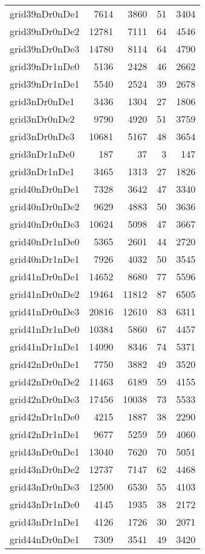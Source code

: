 \begin{longtable}{lrrrr}
grid39nDr0nDe1 & 7614 & 3860 & 51 & 3404 \\
grid39nDr0nDe2 & 12781 & 7111 & 64 & 4546 \\
grid39nDr0nDe3 & 14780 & 8114 & 64 & 4790 \\
grid39nDr1nDe0 & 5136 & 2428 & 46 & 2662 \\
grid39nDr1nDe1 & 5540 & 2524 & 39 & 2678 \\
grid3nDr0nDe1 & 3436 & 1304 & 27 & 1806 \\
grid3nDr0nDe2 & 9790 & 4920 & 51 & 3759 \\
grid3nDr0nDe3 & 10681 & 5167 & 48 & 3654 \\
grid3nDr1nDe0 & 187 & 37 & 3 & 147 \\
grid3nDr1nDe1 & 3465 & 1313 & 27 & 1826 \\
grid40nDr0nDe1 & 7328 & 3642 & 47 & 3340 \\
grid40nDr0nDe2 & 9629 & 4883 & 50 & 3636 \\
grid40nDr0nDe3 & 10624 & 5098 & 47 & 3667 \\
grid40nDr1nDe0 & 5365 & 2601 & 44 & 2720 \\
grid40nDr1nDe1 & 7926 & 4032 & 50 & 3545 \\
grid41nDr0nDe1 & 14652 & 8680 & 77 & 5596 \\
grid41nDr0nDe2 & 19464 & 11812 & 87 & 6505 \\
grid41nDr0nDe3 & 20816 & 12610 & 83 & 6311 \\
grid41nDr1nDe0 & 10384 & 5860 & 67 & 4457 \\
grid41nDr1nDe1 & 14090 & 8346 & 74 & 5371 \\
grid42nDr0nDe1 & 7750 & 3882 & 49 & 3520 \\
grid42nDr0nDe2 & 11463 & 6189 & 59 & 4155 \\
grid42nDr0nDe3 & 17456 & 10038 & 73 & 5533 \\
grid42nDr1nDe0 & 4215 & 1887 & 38 & 2290 \\
grid42nDr1nDe1 & 9677 & 5259 & 59 & 4060 \\
grid43nDr0nDe1 & 13040 & 7620 & 70 & 5051 \\
grid43nDr0nDe2 & 12737 & 7147 & 62 & 4468 \\
grid43nDr0nDe3 & 12500 & 6530 & 55 & 4103 \\
grid43nDr1nDe0 & 4145 & 1935 & 38 & 2172 \\
grid43nDr1nDe1 & 4126 & 1726 & 30 & 2071 \\
grid44nDr0nDe1 & 7309 & 3541 & 49 & 3420 \\

\end{longtable}
